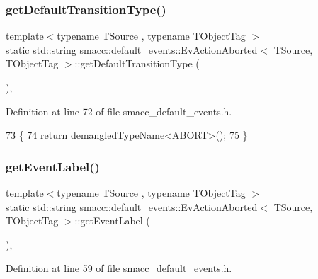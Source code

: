 \subsubsection{\texorpdfstring{get\+Default\+Transition\+Type()}{getDefaultTransitionType()}}
{\footnotesize\ttfamily template$<$typename T\+Source , typename T\+Object\+Tag $>$ \\
static std\+::string \hyperlink{structsmacc_1_1default__events_1_1EvActionAborted}{smacc\+::default\+\_\+events\+::\+Ev\+Action\+Aborted}$<$ T\+Source, T\+Object\+Tag $>$\+::get\+Default\+Transition\+Type (\begin{DoxyParamCaption}{ }\end{DoxyParamCaption})\hspace{0.3cm}{\ttfamily [inline]}, {\ttfamily [static]}}



Definition at line 72 of file smacc\+\_\+default\+\_\+events.\+h.


\begin{DoxyCode}
73   \{
74     \textcolor{keywordflow}{return} demangledTypeName<ABORT>();
75   \}
\end{DoxyCode}
\mbox{\label{structsmacc_1_1default__events_1_1EvActionAborted_ae3613f85ce29214e061ea2677a4d28e1}} 
\subsubsection{\texorpdfstring{get\+Event\+Label()}{getEventLabel()}}
{\footnotesize\ttfamily template$<$typename T\+Source , typename T\+Object\+Tag $>$ \\
static std\+::string \hyperlink{structsmacc_1_1default__events_1_1EvActionAborted}{smacc\+::default\+\_\+events\+::\+Ev\+Action\+Aborted}$<$ T\+Source, T\+Object\+Tag $>$\+::get\+Event\+Label (\begin{DoxyParamCaption}{ }\end{DoxyParamCaption})\hspace{0.3cm}{\ttfamily [inline]}, {\ttfamily [static]}}



Definition at line 59 of file smacc\+\_\+default\+\_\+events.\+h.


